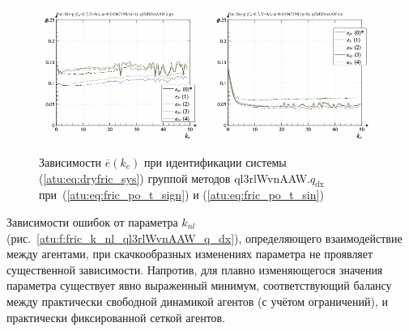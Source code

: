 \begin{figure}[htb!]
  \centerline{
    \includegraphics[width=0.49\textwidth]{p/cha/fric/ql3rlWvnAAW/fric_id-p_k_e_sign.png}
    \hfill
    \includegraphics[width=0.49\textwidth]{p/cha/fric/ql3rlWvnAAW/fric_id-p_k_e_sin.png}
  }
  \caption{Зависимости $\overline{e}(k_e)$ при идентификации системы (\ref{atu:eq:dryfric_sys}) группой методов ql3rlWvnAAW.$q_\mathrm{dx}$
   при~(\ref{atu:eq:fric_po_t_sign}) и (\ref{atu:eq:fric_po_t_sin})}
  \label{atu:f:fric_k_e_ql3rlWvnAAW_q_dx}
\end{figure}

Зависимости ошибок от параметра $k_{nl}$
(рис.~\ref{atu:f:fric_k_nl_ql3rlWvnAAW_q_dx}),
определяющего взаимодействие между агентами,
при скачкообразных изменениях параметра
не проявляет существенной зависимости.
Напротив, для плавно изменяющегося значения параметра
существует явно выраженный минимум, соответствующий
балансу между практически свободной динамикой агентов (с учётом ограничений),
и практически фиксированной сеткой агентов.

